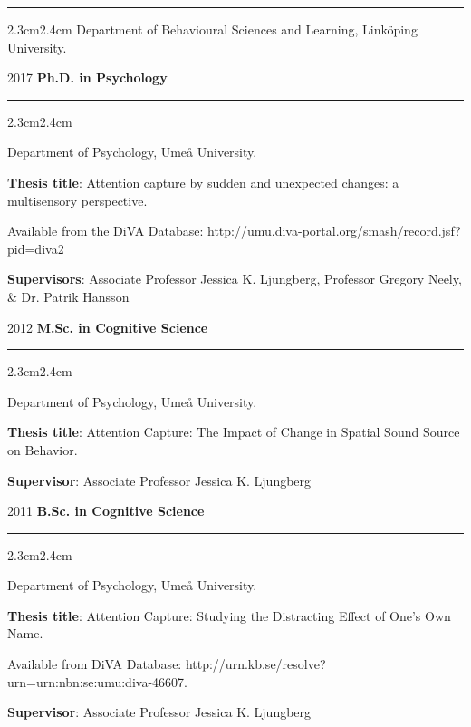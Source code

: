 \documentclass[]{article}
\begin{document}
\hrule

\begin{changemargin}{2.3cm}{2.4cm}
Department of Behavioural Sciences and Learning, Linköping University.
\end{changemargin}

2017 \hspace{1.5cm} \textbf{Ph.D. in Psychology}\vspace{1mm}

\hrule

\begin{changemargin}{2.3cm}{2.4cm}

Department of Psychology, Umeå University.

\textbf{Thesis title}: Attention capture by sudden and unexpected changes: a multisensory perspective. 

Available from the DiVA Database: \sloppy http://umu.diva-portal.org/smash/record.jsf?pid=diva2%

\textbf{Supervisors}: Associate Professor Jessica K. Ljungberg, Professor Gregory Neely, \& Dr. Patrik Hansson
\end{changemargin}

2012 \hspace{1.5cm}\textbf{M.Sc. in Cognitive Science}\vspace{1mm}

\hrule
\begin{changemargin}{2.3cm}{2.4cm}

Department of Psychology, Umeå University.

\textbf{Thesis title}: Attention Capture: The Impact of Change in Spatial Sound Source on Behavior. 
    
\textbf{Supervisor}: Associate Professor Jessica K. Ljungberg
\end{changemargin}

2011 \hspace{1.5cm}\textbf{B.Sc. in Cognitive Science}\vspace{1mm}

\hrule

\begin{changemargin}{2.3cm}{2.4cm}

Department of Psychology, Umeå University.

\textbf{Thesis title}:  Attention Capture: Studying the Distracting Effect of One’s Own Name.

Available from DiVA Database: \sloppy http://urn.kb.se/resolve?urn=urn:nbn:se:umu:diva-46607.
    
\textbf{Supervisor}: Associate Professor Jessica K. Ljungberg
\end{changemargin}
\end{document}
